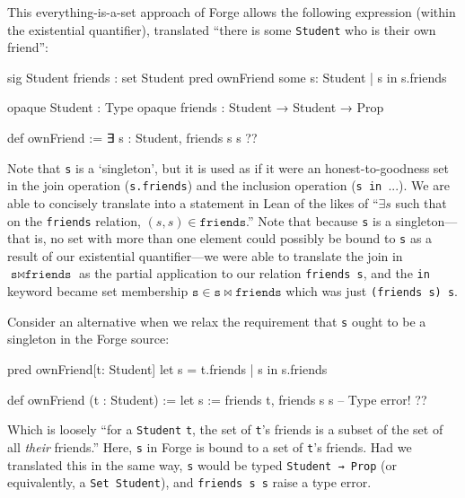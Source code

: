 This everything-is-a-set approach of Forge allows the following expression (within the existential quantifier), translated ``there is some \texttt{Student} who is their own friend'': 

\newpage
\vspace{0.5em}
\noindent\begin{minipage}{0.5\textwidth}
\begin{forge*}
sig Student {
  friends : set Student
}
pred ownFriend {
  some s: Student |
    s in s.friends
}
\end{forge*}
\end{minipage}%
\begin{minipage}{0.5\textwidth}
\begin{lean*}
opaque Student : Type
opaque friends : Student → Student → Prop

def ownFriend := 
  ∃ s : Student, 
    friends s s
?\phantom{}?
\end{lean*}
\end{minipage}
\vspace{0.5em}\newline
Note that \texttt{s} is a `singleton', but it is used as if it were an honest-to-goodness set in the join operation (\texttt{s.friends}) and the inclusion operation (\texttt{s in }...). We are able to concisely translate into a statement in Lean of the likes of ``$\exists s$ such that on the \texttt{friends} relation, $(s,s)\in \texttt{friends}$.'' Note that because \texttt{s} is a singleton---that is, no set with more than one element could possibly be bound to \texttt{s} as a result of our existential quantifier---we were able to translate the join in $\texttt{s} \bowtie \texttt{friends}$ as the partial application to our relation \texttt{friends s}, and the \texttt{in} keyword became set membership $\texttt{s}\in \texttt{s} \bowtie \texttt{friends}$ which was just \texttt{(friends s) s}. 

Consider an alternative when we relax the requirement that \texttt{s} ought to be a singleton in the Forge source: 

\vspace{0.5em}
\noindent\begin{minipage}{0.5\textwidth}
\begin{forge*}
pred ownFriend[t: Student] {
  let s = t.friends |
    s in s.friends
}
\end{forge*}
\end{minipage}%
\begin{minipage}{0.5\textwidth}
\begin{lean*}
def ownFriend (t : Student) := 
  let s := friends t, 
    friends s s -- Type error!
?\phantom{}?
\end{lean*}
\end{minipage}
\vspace{0.5em}\newline
Which is loosely ``for a \texttt{Student} \texttt{t}, the set of \texttt{t}'s friends is a subset of the set of all \emph{their} friends.'' Here, \texttt{s} in Forge is bound to a set of \texttt{t}'s friends. Had we translated this in the same way, \texttt{s} would be typed \texttt{Student → Prop} (or equivalently, a \texttt{Set Student}), and \texttt{friends s s} raise a type error. 

